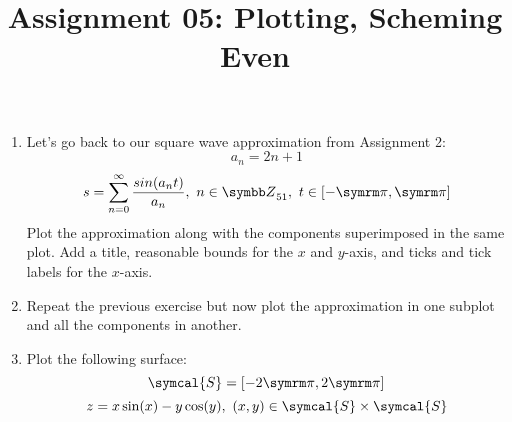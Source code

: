 \documentclass{article}
\title{Assignment 05: Plotting, Scheming Even}
\begin{document}
\renderTitle

\begin{enumerate}[leftmargin=*]
	\item
		Let's go back to our square wave approximation from
		Assignment 2:
		\begin{equation}
			a_n = 2n + 1
		\end{equation}
		\begin{equation}
			s
			=
			\sum_{n = 0}^\infty
			\frac{sin(a_n t)}{a_n},
			\ n \in \Z_{51},
			\ t \in [-\cpi, \cpi]
		\end{equation}
		Plot the approximation along with the components
		superimposed in the same plot.  Add a title, reasonable
		bounds for the \(x\) and \(y\)-axis, and ticks and tick
		labels for the \(x\)-axis.

	\item
		Repeat the previous exercise but now plot the
		approximation in one subplot and all the components in
		another.

	\item
		Plot the following surface:
		\begin{equation}
			\symcal{S} = [-2\cpi, 2\cpi]
		\end{equation}
		\begin{equation}
			z = x\sin(x) - y\cos(y),
			\ (x, y) \in \symcal{S} \times \symcal{S}
		\end{equation}
\end{enumerate}
\end{document}
